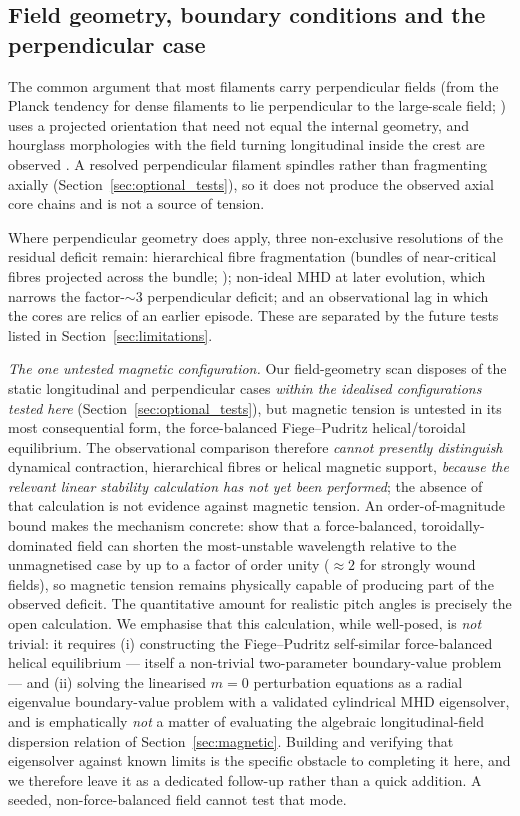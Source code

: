 \documentclass[usenatbib,twoside,twocolumn]{mnras}
\begin{document}
\subsection{Field geometry, boundary conditions and the perpendicular case}
\label{sec:why_mhd_fails}

The common argument that most filaments carry perpendicular fields (from the Planck tendency for dense filaments to lie perpendicular to the large-scale field; \citealt{Planck2016}) uses a projected orientation that need not equal the internal geometry, and hourglass morphologies with the field turning longitudinal inside the crest are observed \citep{Jadhav2026}. A resolved perpendicular filament spindles rather than fragmenting axially (Section~\ref{sec:optional_tests}), so it does not produce the observed axial core chains and is not a source of tension.

Where perpendicular geometry does apply, three non-exclusive resolutions of the residual deficit remain: hierarchical fibre fragmentation (bundles of near-critical fibres projected across the bundle; \citealt{Hacar2013,Hacar2018,Yang2024}); non-ideal MHD at later evolution, which narrows the factor-$\sim3$ perpendicular deficit; and an observational lag in which the cores are relics of an earlier episode. These are separated by the future tests listed in Section~\ref{sec:limitations}.

\emph{The one untested magnetic configuration.} Our field-geometry scan disposes of the static longitudinal and perpendicular cases \emph{within the idealised configurations tested here} (Section~\ref{sec:optional_tests}), but magnetic tension is untested in its most consequential form, the force-balanced Fiege--Pudritz helical/toroidal equilibrium. The observational comparison therefore \emph{cannot presently distinguish} dynamical contraction, hierarchical fibres or helical magnetic support, \emph{because the relevant linear stability calculation has not yet been performed}; the absence of that calculation is not evidence against magnetic tension. An order-of-magnitude bound makes the mechanism concrete: \citet{Fiege2000} show that a force-balanced, toroidally-dominated field can shorten the most-unstable wavelength relative to the unmagnetised case by up to a factor of order unity ($\approx2$ for strongly wound fields), so magnetic tension remains physically capable of producing part of the observed deficit. The quantitative amount for realistic pitch angles is precisely the open calculation. We emphasise that this calculation, while well-posed, is \emph{not} trivial: it requires (i) constructing the Fiege--Pudritz self-similar force-balanced helical equilibrium --- itself a non-trivial two-parameter boundary-value problem --- and (ii) solving the linearised $m=0$ perturbation equations as a radial eigenvalue boundary-value problem with a validated cylindrical MHD eigensolver, and is emphatically \emph{not} a matter of evaluating the algebraic longitudinal-field dispersion relation of Section~\ref{sec:magnetic}. Building and verifying that eigensolver against known limits is the specific obstacle to completing it here, and we therefore leave it as a dedicated follow-up rather than a quick addition. A seeded, non-force-balanced field cannot test that mode.
\end{document}
